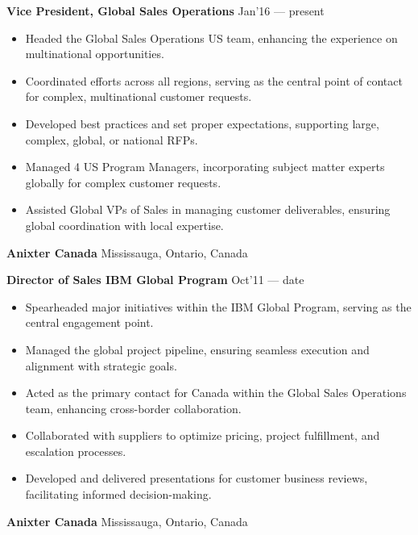 \documentclass[11pt]{article}
\begin{document}
\textbf{Vice President, Global Sales Operations} \hfill Jan’16 — present
\begin{itemize}[noitemsep, topsep=0pt, partopsep=0pt, parsep=0pt]
    \item Headed the Global Sales Operations US team, enhancing the experience on multinational opportunities.
    \item Coordinated efforts across all regions, serving as the central point of contact for complex, multinational customer requests.
    \item Developed best practices and set proper expectations, supporting large, complex, global, or national RFPs.
    \item Managed 4 US Program Managers, incorporating subject matter experts globally for complex customer requests.
    \item Assisted Global VPs of Sales in managing customer deliverables, ensuring global coordination with local expertise.
\end{itemize}
\vspace{8pt}
\textbf{Anixter Canada} \hfill Mississauga, Ontario, Canada

\textbf{Director of Sales IBM Global Program} \hfill Oct’11 — date
\begin{itemize}[noitemsep, topsep=0pt, partopsep=0pt, parsep=0pt]
    \item Spearheaded major initiatives within the IBM Global Program, serving as the central engagement point.
    \item Managed the global project pipeline, ensuring seamless execution and alignment with strategic goals.
    \item Acted as the primary contact for Canada within the Global Sales Operations team, enhancing cross-border collaboration.
    \item Collaborated with suppliers to optimize pricing, project fulfillment, and escalation processes.
    \item Developed and delivered presentations for customer business reviews, facilitating informed decision-making.
\end{itemize}
\vspace{8pt}
\textbf{Anixter Canada} \hfill Mississauga, Ontario, Canada
\end{document}

